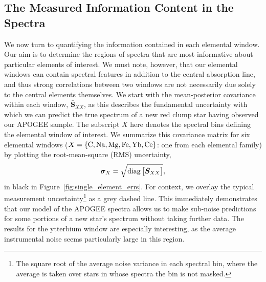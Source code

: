 \documentclass[a4paper,fleqn,usenatbib]{mnras}
\newcommand{\speccov}{{\bm S}}
\begin{document}
\subsection{The Measured Information Content in the Spectra}
\label{sec:info}

We now turn to quantifying the information contained in each elemental window. Our aim is to determine the regions of spectra that are most informative about particular elements of interest. We must note, however, that our elemental windows can contain spectral features in addition to the central absorption line, and thus strong correlations between two windows are not necessarily due solely to the central elements themselves.
We start with the mean-posterior covariance within each window, $\bar{\speccov}_{XX}$, as this describes the fundamental uncertainty with which we can predict the true spectrum of a new red clump star having observed our APOGEE sample. The subscript $X$ here denotes the spectral bins defining the elemental window of interest. We summarize this covariance matrix for six elemental windows ($X=\{{\rm C, Na, Mg, Fe, Yb, Ce}\}$: one from each elemental family) by plotting the root-mean-square (RMS) uncertainty,
\begin{equation}
\bm{\sigma}_X = \sqrt{{\rm diag} \left[\bar{\speccov}_{XX}\right]},
\end{equation}
in black in Figure~\ref{fig:single_element_errs}. For context, we overlay the typical measurement uncertainty\footnote{The square root of the average noise variance in each spectral bin, where the average is taken over stars in whose spectra the bin is not masked.} as a grey dashed line. This immediately demonstrates that our model of the APOGEE spectra allows us to make sub-noise predictions for some portions of a new star's spectrum without taking further data. The results for the ytterbium window are especially interesting, as the average instrumental noise seems particularly large in this region.
\end{document}
